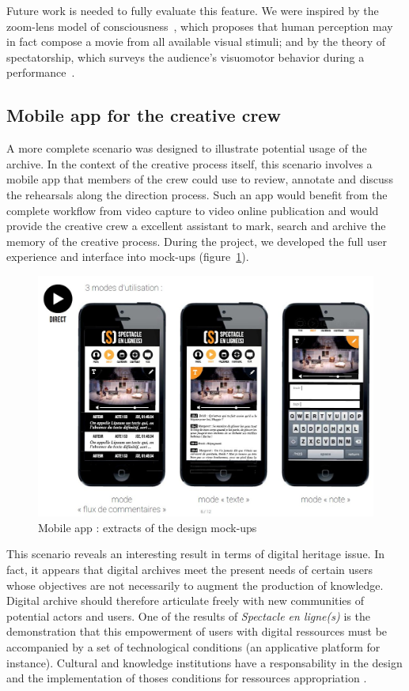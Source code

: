 \documentclass[conference]{IEEEtran}
\begin{document}
Future work is needed to fully evaluate this feature. We were inspired by the zoom-lens model of consciousness~\cite{Eriksen86}, 
which proposes  that human perception  may in fact compose a movie from all available visual  stimuli; and by the theory 
of spectatorship, which surveys the audience's visuomotor behavior  during a performance~\cite{Bennett97}.   

\subsection{Mobile app for the creative crew} 

A more complete scenario was designed to illustrate potential usage of the archive. In the context of the creative process itself, this scenario involves a mobile app that members of the crew could use to review, annotate and discuss the rehearsals along the direction process. Such an app would benefit from the complete workflow from video capture to video online publication and would provide the creative crew a excellent assistant to mark, search and archive the memory of the creative process. During the project, we developed the full user experience and interface into mock-ups (figure~\ref{fig:mobileapp}).

\begin{figure}[htb!]
  \centering
  \includegraphics[width=\columnwidth]{mobileapp}
  \caption{Mobile app : extracts of the design mock-ups}
  \label{fig:mobileapp}
\end{figure}

This scenario reveals an interesting result in terms of digital heritage issue. In fact, it appears that digital archives meet the present needs of certain users whose objectives are not necessarily to augment the production of knowledge. Digital archive should therefore articulate freely with new communities of potential actors and users. One of the results of \emph{Spectacle en ligne(s)} is the demonstration that this empowerment of users with digital ressources must be accompanied by a set of technological conditions (an applicative platform for instance). Cultural and knowledge institutions have a responsability in the design and the implementation of thoses conditions for ressources appropriation \cite{Sauret15}.
\end{document}
